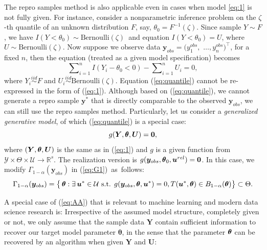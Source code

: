 \documentclass[12pt]{article}
\theoremstyle{shortspace}
\def\*#1{\bm{#1}}
\def\btheta{\mathop{\theta\kern-.45em\hbox{$\theta$}}\nolimits}
\newcommand{\R}{\mathbb{R}}
\begin{document}
The repro samples method is also applicable even in cases  when 
model \eqref{eq:1} is not fully given.
For instance, consider a nonparametric inference problem on the $\zeta$-th quantile  
of an 
unknown distribution $F$,  
say, 
$\theta_0 = F^{-1}(\zeta)$. Since sample
$Y \sim F$, we have $I(Y < \theta_0) \sim \text{Bernoulli}(\zeta)$~and  equation
$I(Y < \theta_0) = U$, where $U \sim \text{Bernoulli}(\zeta)$. Now suppose we observe data $\*y_{obs} =  (y_1^{obs}, $ $ \ldots, y_n^{obs})^\top$, for a fixed $n$, then the equation (treated as a given model specification) becomes 
\begin{equation} \label{eq:quantile}
    \sum\nolimits_{i=1}^{n} I(Y_i - \theta_0 <0) - \sum\nolimits_{i=1}^n U_i = 0,
\end{equation}
where $Y_i \overset{iid}{\sim} F$ and $U_i \overset{iid}{\sim} \text{Bernoulli}(\zeta)$. 
Equation (\ref{eq:quantile}) 
cannot be re-expressed in the form of (\ref{eq:1}).
Although based on (\ref{eq:quantile}),
we cannot generate a repro sample ${\*y}^*$ that is directly comparable to the observed  $\*y_{obs}$, we can still use the repro samples method. 
Particularly, let us
consider a {\it generalized generative 
model}, of which (\ref{eq:quantile}) is a special case: 
\vspace{-2mm}\begin{equation}
    \label{eq:AA}
    g(\*Y, \btheta, \*U) = \*0,
\end{equation} 
where $(\*Y, \btheta, \*U)$ is the same as in (\ref{eq:1}) and $g$ is a given  
function from ${\mathcal Y} \times \Theta \times {\mathcal U}  \to \R^s$.
The 
realization version is
  $g(\*y_{obs}, \btheta_0, \*u^{rel}) = \*0$.
In this case, 
we modify $\Gamma_{1-\alpha}(\*y_{obs})$ in (\ref{eq:G1})~as~follows: 
\begin{eqnarray}
\label{eq:G2}
\Gamma_{1-\alpha}(\*y_{obs}) = \big\{\btheta:  \exists 
\,\*u^* \in {\mathcal U} \mbox{ s.t. } 
 g(\*y_{obs}, \btheta, \*u^*) = 0, T(\*u^*, \btheta)  \in B_{1 - \alpha}(\btheta)
\big\} \subset \Theta.
\end{eqnarray}

A special case of (\ref{eq:AA}) that is relevant to machine learning and modern data science research is: 
Irrespective of the  assumed model structure, 
completely given or not, 
we only assume that the sample data $\*Y$  contain sufficient information to recover our target model parameter $\boldsymbol{\theta}$, in the sense that the parameter $\btheta$ can be recovered by an algorithm 
when given $\*Y$ and $\*U$:
\end{document}
